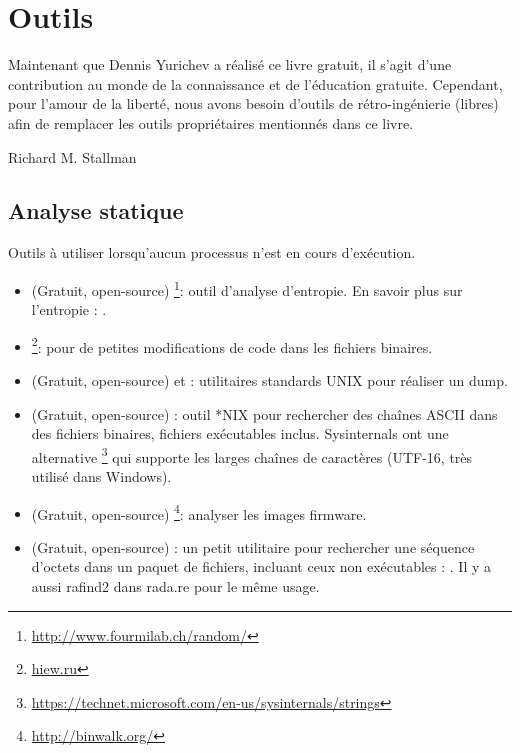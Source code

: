 \chapter{Outils}

\epigraph{Maintenant que Dennis Yurichev a réalisé ce livre gratuit, il s'agit d'une contribution au monde de la connaissance et de l'éducation gratuite.
Cependant, pour l'amour de la liberté, nous avons besoin d'outils de rétro-ingénierie (libres) afin de remplacer les outils propriétaires mentionnés dans ce livre.}{Richard M. Stallman}

\section{Analyse statique}

Outils à utiliser lorsqu'aucun processus n'est en cours d'exécution.


\begin{itemize}
\item
(Gratuit, open-source) \footnote{\url{http://www.fourmilab.ch/random/}}: outil d'analyse d'entropie.
En savoir plus sur l'entropie : .

\item
\label{Hiew}
\footnote{\href{http://go.yurichev.com/17035}{hiew.ru}}:
pour de petites modifications de code dans les fichiers binaires.

\item (Gratuit, open-source)  et : utilitaires standards UNIX pour réaliser un dump.

\item (Gratuit, open-source) : outil *NIX pour rechercher des chaînes ASCII dans des fichiers binaires, fichiers exécutables inclus.
Sysinternals ont une alternative \footnote{\url{https://technet.microsoft.com/en-us/sysinternals/strings}}
qui supporte les larges chaînes de caractères (UTF-16, très utilisé dans Windows).

\item (Gratuit, open-source) \footnote{\url{http://binwalk.org/}}: analyser les images firmware.

\item
{}
(Gratuit, open-source) :
un petit utilitaire pour rechercher une séquence d'octets dans un paquet de fichiers,
incluant ceux non exécutables : \BGREPURL.
Il y a aussi rafind2 dans rada.re pour le même usage.
\end{itemize}

